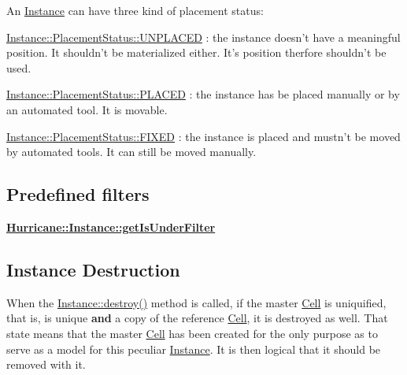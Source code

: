 An \hyperlink{classHurricane_1_1Instance}{Instance} can have three kind of placement status\-:
\begin{DoxyItemize}
\item \hyperlink{classHurricane_1_1Instance_1_1PlacementStatus_af76cc0838783b3eb3a515eb3c3e0f7bfa3e19a0a1b3e8c8fd860164df7f935216}{Instance\-::\-Placement\-Status\-::\-U\-N\-P\-L\-A\-C\-E\-D} \-: the instance doesn't have a meaningful position. It shouldn't be materialized either. It's position therfore shouldn't be used.
\item \hyperlink{classHurricane_1_1Instance_1_1PlacementStatus_af76cc0838783b3eb3a515eb3c3e0f7bfaf3589c11ecd7d5de63db24826b74d457}{Instance\-::\-Placement\-Status\-::\-P\-L\-A\-C\-E\-D} \-: the instance has be placed manually or by an automated tool. It is movable.
\item \hyperlink{classHurricane_1_1Instance_1_1PlacementStatus_af76cc0838783b3eb3a515eb3c3e0f7bfa47be8a40f04081635fe24485ae7c6bd7}{Instance\-::\-Placement\-Status\-::\-F\-I\-X\-E\-D} \-: the instance is placed and mustn't be moved by automated tools. It can still be moved manually.
\end{DoxyItemize}\hypertarget{classHurricane_1_1Instance_secInstancePredefinedFilters}{}\subsection{Predefined filters}\label{classHurricane_1_1Instance_secInstancePredefinedFilters}
{\bfseries \hyperlink{classHurricane_1_1Instance_ae2bc936dfecfaf70a0052959b4b2861e}{Hurricane\-::\-Instance\-::get\-Is\-Under\-Filter}}\hypertarget{classHurricane_1_1Instance_secInstanceDestroy}{}\subsection{Instance Destruction}\label{classHurricane_1_1Instance_secInstanceDestroy}
When the \hyperlink{classHurricane_1_1DBo_a67febf5bf9c8b322674648688639728b}{Instance\-::destroy()} method is called, if the master \hyperlink{classHurricane_1_1Cell}{Cell} is uniquified, that is, is unique {\bfseries and} a copy of the reference \hyperlink{classHurricane_1_1Cell}{Cell}, it is destroyed as well. That state means that the master \hyperlink{classHurricane_1_1Cell}{Cell} has been created for the only purpose as to serve as a model for this peculiar \hyperlink{classHurricane_1_1Instance}{Instance}. It is then logical that it should be removed with it. 

